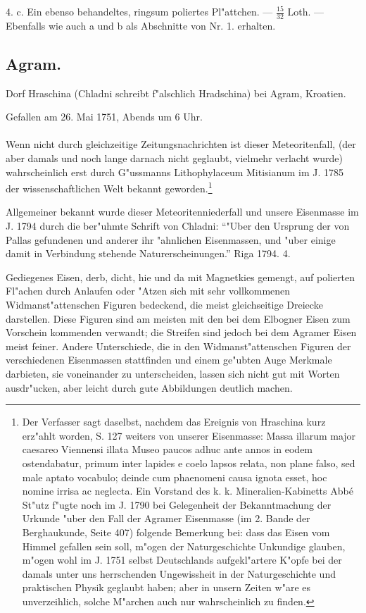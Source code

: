 \documentclass[a4paper, 11pt, oneside, polutonikogreek, german]{article}
\begin{document}
4. c. Ein ebenso behandeltes, ringsum poliertes Pl"attchen. --- $\frac{15}{32}$ Loth. --- Ebenfalls wie auch a und b als Abschnitte von Nr. 1. erhalten.
\subsection{Agram.}
\begin{center}
\small
Dorf Hraschina (Chladni schreibt f"alschlich Hradschina) bei Agram, Kroatien.

Gefallen am 26. Mai 1751, Abends um 6 Uhr.
\end{center}
\paragraph{}
Wenn nicht durch gleichzeitige Zeitungsnachrichten ist dieser Meteoritenfall, (der aber damals und noch lange darnach nicht geglaubt, vielmehr verlacht wurde) wahrscheinlich erst durch G"ussmanns Lithophylaceum Mitisianum im J. 1785 der wissenschaftlichen Welt bekannt geworden.\footnote{Der Verfasser sagt daselbst, nachdem das Ereignis von Hraschina kurz erz"ahlt worden, S. 127 weiters von unserer Eisenmasse: Massa illarum major caesareo Viennensi illata Museo paucos adhuc ante annos in eodem ostendabatur, primum inter lapides e coelo lapsos relata, non plane falso, sed male aptato vocabulo; deinde cum phaenomeni causa ignota esset, hoc nomine irrisa ac neglecta. Ein Vorstand des k. k. Mineralien-Kabinetts Abbé St"utz f"ugte noch im J. 1790 bei Gelegenheit der Bekanntmachung der Urkunde "uber den Fall der Agramer Eisenmasse (im 2. Bande der Berghaukunde, Seite 407) folgende Bemerkung bei: dass das Eisen vom Himmel gefallen sein soll, m"ogen der Naturgeschichte Unkundige glauben, m"ogen wohl im J. 1751 selbst Deutschlands aufgekl"artere K"opfe bei der damals unter uns herrschenden Ungewissheit in der Naturgeschichte und praktischen Physik geglaubt haben; aber in unsern Zeiten w"are es unverzeihlich, solche M"archen auch nur wahrscheinlich zu finden.}

Allgemeiner bekannt wurde dieser Meteoritenniederfall und unsere Eisenmasse im J. 1794 durch die ber"uhmte Schrift von Chladni: "`"Uber den Ursprung der von Pallas gefundenen und anderer ihr "ahnlichen Eisenmassen, und "uber einige damit in Verbindung stehende Naturerscheinungen."' Riga 1794. 4.

Gediegenes Eisen, derb, dicht, hie und da mit Magnetkies gemengt, auf polierten Fl"achen durch Anlaufen oder "Atzen sich mit sehr vollkommenen Widmanst"attenschen Figuren bedeckend, die meist gleichseitige Dreiecke darstellen. Diese Figuren sind am meisten mit den bei dem Elbogner Eisen zum Vorschein kommenden verwandt; die Streifen sind jedoch bei dem Agramer Eisen meist feiner. Andere Unterschiede, die in den Widmanst"attenschen Figuren der verschiedenen Eisenmassen stattfinden und einem ge"ubten Auge Merkmale darbieten, sie voneinander zu unterscheiden, lassen sich nicht gut mit Worten ausdr"ucken, aber leicht durch gute Abbildungen deutlich machen.
\end{document}
